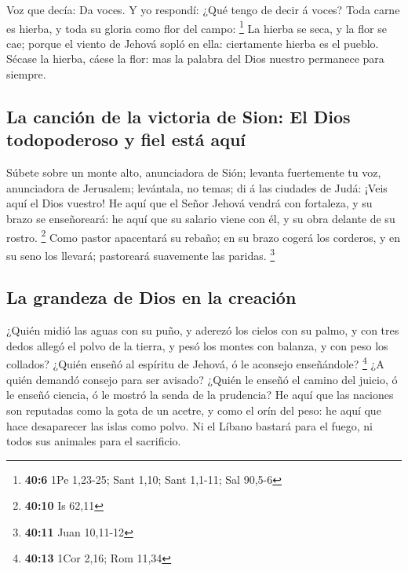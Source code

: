  Voz que decía: Da voces. Y yo respondí: ¿Qué tengo de
decir á voces? Toda carne es hierba, y toda su gloria como flor del
campo: \footnote{\textbf{40:6} 1Pe 1,23-25; Sant 1,10; Sant 1,1-11; Sal
  90,5-6}  La hierba se seca, y la flor se cae; porque el
viento de Jehová sopló en ella: ciertamente hierba es el pueblo.
 Sécase la hierba, cáese la flor: mas la palabra del Dios
nuestro permanece para siempre.

\hypertarget{la-canciuxf3n-de-la-victoria-de-sion-el-dios-todopoderoso-y-fiel-estuxe1-aquuxed}{%
\subsection{La canción de la victoria de Sion: El Dios todopoderoso y
fiel está
aquí}\label{la-canciuxf3n-de-la-victoria-de-sion-el-dios-todopoderoso-y-fiel-estuxe1-aquuxed}}

 Súbete sobre un monte alto, anunciadora de Sión; levanta
fuertemente tu voz, anunciadora de Jerusalem; levántala, no temas; di á
las ciudades de Judá: ¡Veis aquí el Dios vuestro!  He
aquí que el Señor Jehová vendrá con fortaleza, y su brazo se
enseñoreará: he aquí que su salario viene con él, y su obra delante de
su rostro. \footnote{\textbf{40:10} Is 62,11}  Como
pastor apacentará su rebaño; en su brazo cogerá los corderos, y en su
seno los llevará; pastoreará suavemente las paridas. \footnote{\textbf{40:11}
  Juan 10,11-12}

\hypertarget{la-grandeza-de-dios-en-la-creaciuxf3n}{%
\subsection{La grandeza de Dios en la
creación}\label{la-grandeza-de-dios-en-la-creaciuxf3n}}

 ¿Quién midió las aguas con su puño, y aderezó los cielos
con su palmo, y con tres dedos allegó el polvo de la tierra, y pesó los
montes con balanza, y con peso los collados?  ¿Quién
enseñó al espíritu de Jehová, ó le aconsejo enseñándole? \footnote{\textbf{40:13}
  1Cor 2,16; Rom 11,34}  ¿A quién demandó consejo para
ser avisado? ¿Quién le enseñó el camino del juicio, ó le enseñó ciencia,
ó le mostró la senda de la prudencia?  He aquí que las
naciones son reputadas como la gota de un acetre, y como el orín del
peso: he aquí que hace desaparecer las islas como polvo. 
Ni el Líbano bastará para el fuego, ni todos sus animales para el
sacrificio.

